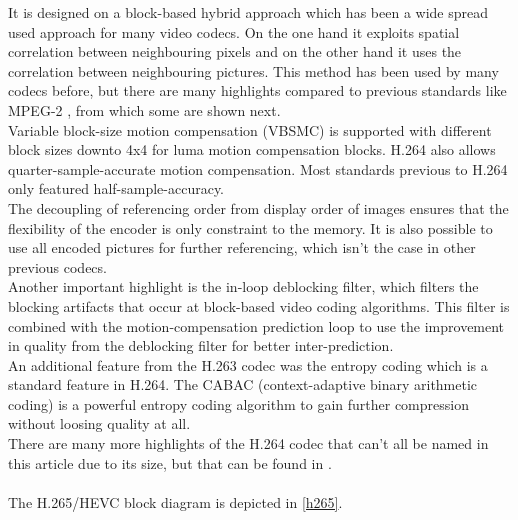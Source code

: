 It is designed on a block-based hybrid approach which has been a wide spread used approach for many video codecs.  On the one hand it exploits spatial correlation between neighbouring pixels and on the other hand it uses the correlation between neighbouring pictures. This method has been used by many codecs before, but there are many highlights compared to previous standards like MPEG-2 \cite{MPEG2}, from which some are shown next.\\
Variable block-size motion compensation (VBSMC) is supported with different block sizes downto 4x4 for luma motion compensation blocks. H.264 also allows quarter-sample-accurate motion compensation. Most standards previous to H.264 only featured half-sample-accuracy.\\ The decoupling of referencing order from display order of images ensures that the flexibility of the encoder is only constraint to the memory. It is also possible to use all encoded pictures for further referencing, which isn't the case in other previous codecs.\\
Another important highlight is the in-loop deblocking filter, which filters the blocking artifacts that occur at block-based video coding algorithms. This filter is combined with the motion-compensation prediction loop to use the improvement in quality from the deblocking filter for better inter-prediction.\\
An additional feature from the H.263 codec was the entropy coding which is a standard feature in H.264. The CABAC (context-adaptive binary arithmetic coding) \cite{cabac} is a powerful entropy coding algorithm to gain further compression without loosing quality at all.\\
There are many more highlights of the H.264 codec that can't all be named in this article due to its size, but that can be found in \cite{H264_Overview}.\\
\\


The H.265/HEVC \cite{H265_Overview} block diagram is depicted in \ref{h265}. 


